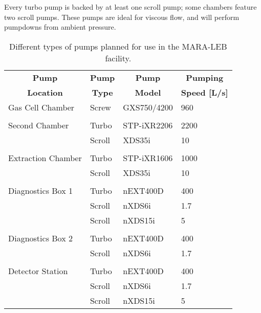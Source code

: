 Every turbo pump is backed by at least one  scroll pump; some chambers feature  two scroll pumps. These pumps are ideal for viscous flow, and will perform pumpdowns from ambient pressure. 

\begin{table}[h!]
    \caption{Different types of pumps planned for use in the MARA-LEB facility.}
     \label{tab:Pumps}
    \centering
    \hspace*{-0.5em}
    \begin{tabular}{@{}llll@{}}
    \hline
    \multicolumn{1}{c}{\textbf{Pump}} & \multicolumn{1}{c}{\textbf{Pump}}  & \multicolumn{1}{c}{\textbf{Pump}} & \multicolumn{1}{c}{\textbf{Pumping}} \\
    \multicolumn{1}{c}{\textbf{Location}} & \multicolumn{1}{c}{\textbf{Type}} & \multicolumn{1}{c}{\textbf{Model}} & {\textbf{Speed [L/s]}} \\
    \hline
    Gas Cell Chamber    & Screw     & GXS750/4200   & 960   \\ 
                                                            \\
    Second Chamber      & Turbo     & STP-iXR2206   & 2200  \\
                        & Scroll    & XDS35i        & 10    \\ 
                                                            \\
    Extraction Chamber  & Turbo     & STP-iXR1606   & 1000  \\
                        & Scroll    & XDS35i        & 10    \\
                                                            \\
    Diagnostics Box 1   & Turbo     & nEXT400D      & 400   \\
                        & Scroll    & nXDS6i        & 1.7   \\
                        & Scroll    & nXDS15i       & 5     \\
                                                            \\
    Diagnostics Box 2   & Turbo     & nEXT400D      & 400   \\
                        & Scroll    & nXDS6i        & 1.7   \\
                                                            \\
    Detector Station    & Turbo     & nEXT400D      & 400   \\
                        & Scroll    & nXDS6i        & 1.7   \\
                        & Scroll    & nXDS15i       & 5     \\
    \hline
    \end{tabular}
 \end{table}



